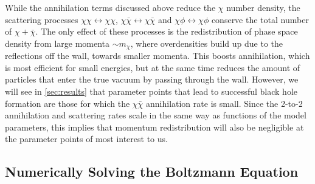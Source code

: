 \documentclass[
onecolumn, %
11pt, %
tightenlines,
superscriptaddress, %
nofootinbib, %
preprintnumbers, %
prd %
]{revtex4-1}
\begin{document}
While the annihilation terms discussed above reduce the $\chi$ number density, the scattering processes $\chi\chi \leftrightarrow \chi\chi$, $\chi\bar\chi \leftrightarrow \chi\bar\chi$ and $\chi\phi \leftrightarrow \chi\phi$ conserve the total number of $\chi+\bar\chi$. The only effect of these processes is the redistribution of phase space density from large momenta $\sim m_\chi$, where overdensities build up due to the reflections off the wall, towards smaller momenta. This boosts annihilation, which is most efficient for small energies, but at the same time reduces the amount of particles that enter the true vacuum by passing through the wall. However, we will see in \cref{sec:results} that parameter points that lead to successful black hole formation are those for which the $\chi\bar\chi$ annihilation rate is small. Since the 2-to-2 annihilation and scattering rates scale in the same way as functions of the model parameters, this implies that momentum redistribution will also be negligible at the parameter points of most interest to us.


\subsection{Numerically Solving the Boltzmann Equation}
\label{sec:implementation}
\end{document}
